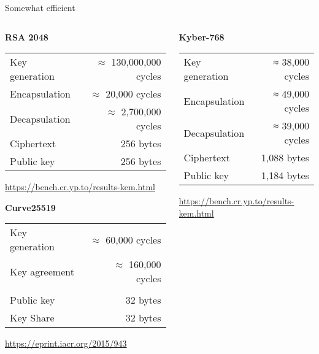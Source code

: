 \documentclass[xcolor=table,10pt,aspectratio=169]{beamer}
\begin{document}
\begin{frame}[label={sec:org3af5d3c}]{Somewhat efficient}
\begin{columns}[t]
\begin{column}{0.5\columnwidth}
\textbf{RSA 2048}

\begin{center}
\begin{tabular}{lr}
\toprule
Key generation & \(\approx\) 130,000,000 cycles\\
Encapsulation & \(\approx\) 20,000 cycles\\
Decapsulation & \(\approx\) 2,700,000 cycles\\
Ciphertext & 256 bytes\\
Public key & 256 bytes\\
\bottomrule
\end{tabular}

\end{center}

{\tiny \url{https://bench.cr.yp.to/results-kem.html} }

\textbf{Curve25519}

\begin{center}
\begin{tabular}{lr}
\toprule
Key generation & \(\approx\) 60,000 cycles\\
Key agreement & \(\approx\) 160,000 cycles\\
 & \\
Public key & 32 bytes\\
Key Share & 32 bytes\\
\bottomrule
\end{tabular}

\end{center}

\tiny \url{https://eprint.iacr.org/2015/943}
\end{column}
\begin{column}{0.5\columnwidth}
\textbf{Kyber-768}

\begin{center}
\begin{tabular}{lr}
\toprule
Key generation & ≈  38,000 cycles\\
Encapsulation & ≈  49,000 cycles\\
Decapsulation & ≈  39,000 cycles\\
Ciphertext & 1,088 bytes\\
Public key & 1,184 bytes\\
\bottomrule
\end{tabular}

\end{center}

\tiny \url{https://bench.cr.yp.to/results-kem.html}
\end{column}
\end{columns}
\end{frame}
\end{document}
